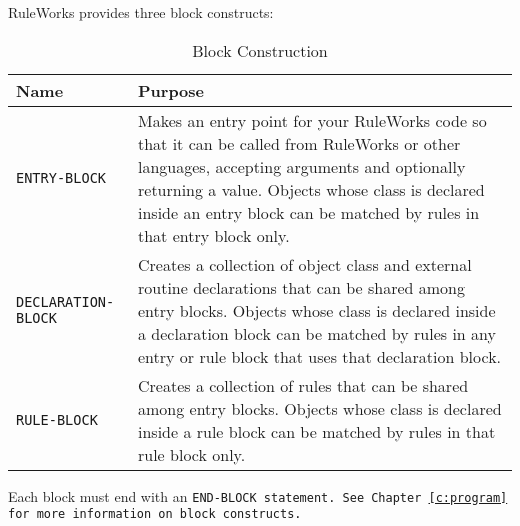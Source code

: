 RuleWorks provides three block constructs:

\begin{table}[h]
  \def\arraystretch{1.2}
  \begin{tabularx}{\columnwidth}{lX}
    \toprule
    Name & Purpose \\
    \midrule
    \tt{ENTRY-BLOCK} & Makes an entry point
                       for your RuleWorks   
                       code so that it can  
                       be called from       
                       RuleWorks or other   
                       languages, accepting 
                       arguments and        
                       optionally returning 
                       a value. Objects     
                       whose class is       
                       declared inside an   
                       entry block can be   
                       matched by rules in  
                       that entry block     
                       only. \\
    \tt{DECLARATION-BLOCK} & Creates a collection
                             of object class and  
                             external routine     
                             declarations that    
                             can be shared among  
                             entry blocks.        
                             Objects whose class  
                             is declared inside a 
                             declaration block    
                             can be matched by    
                             rules in any entry   
                             or rule block that   
                             uses that            
                             declaration block. \\
    \tt{RULE-BLOCK} & Creates a collection
                      of rules that can be 
                      shared among entry   
                      blocks. Objects      
                      whose class is       
                      declared inside a    
                      rule block can be    
                      matched by rules in  
                      that rule block      
                      only. \\                
    \bottomrule
  \end{tabularx}
  \caption{Block Construction}
  \label{t:block}
\end{table}

Each block must end with an \tt{END-BLOCK} statement. See
Chapter~\ref{c:program} for more information on block constructs.

